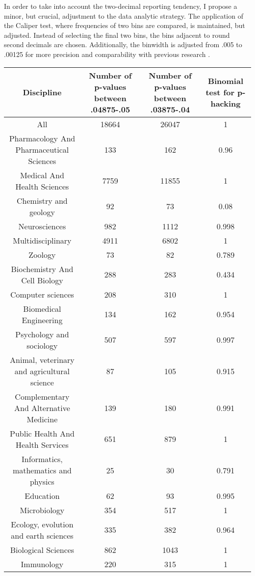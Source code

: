In order to take into account the two-decimal reporting tendency, I propose a minor, but crucial, adjustment to the data analytic strategy. The application of the Caliper test, where frequencies of two bins are compared, is maintained, but adjusted. Instead of selecting the final two bins, the bins adjacent to round second decimals are chosen. Additionally, the binwidth is adjusted from .005 to .00125 for more precision and comparability with previous research \cite{Masicampo2012, Leggett2013}.
\begin{table}
\begin{tabular}{ c c c c }
     Discipline & Number of p-values between .04875-.05 & Number of p-values between .03875-.04 & Binomial test for p-hacking \\
     \hline
    All   & 18664 & 26047 & 1 \\
    Pharmacology And Pharmaceutical Sciences & 133   & 162   & 0.96 \\
    Medical And Health Sciences & 7759  & 11855 & 1 \\
    Chemistry and geology & 92    & 73    & 0.08 \\
    Neurosciences & 982   & 1112  & 0.998 \\
    Multidisciplinary & 4911  & 6802  & 1 \\
    Zoology & 73    & 82    & 0.789 \\
    Biochemistry And Cell Biology & 288   & 283   & 0.434 \\
    Computer sciences & 208   & 310   & 1 \\
    Biomedical Engineering & 134   & 162   & 0.954 \\
    Psychology and sociology & 507   & 597   & 0.997 \\
    Animal, veterinary and agricultural science & 87    & 105   & 0.915 \\
    Complementary And Alternative Medicine & 139   & 180   & 0.991 \\
    Public Health And Health Services & 651   & 879   & 1 \\
    Informatics, mathematics and physics & 25    & 30    & 0.791 \\
    Education & 62    & 93    & 0.995 \\
    Microbiology & 354   & 517   & 1 \\
    Ecology, evolution and earth sciences & 335   & 382   & 0.964 \\
    Biological Sciences & 862   & 1043  & 1 \\
    Immunology & 220   & 315   & 1 \\

\end{tabular}
\end{table}
